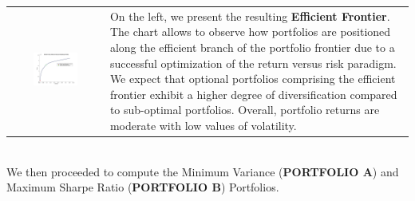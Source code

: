 \documentclass{assignment}
\begin{document}
\begin{tabular}{c m{}}
    \includegraphics[width=0.50\textwidth, valign=c]{assets/Plot_1.jpg}
    &
    On the left, we present the resulting \textbf{Efficient Frontier}. The chart allows to observe
    how portfolios are positioned along the efficient branch of the portfolio frontier due to a
    successful optimization of the return versus risk paradigm. We expect that optional portfolios
    comprising the efficient frontier exhibit a higher degree of diversification compared to
    sub-optimal portfolios. Overall, portfolio returns are moderate with low values of volatility. 
\end{tabular}
\\
We then proceeded to compute the Minimum Variance (\textbf{PORTFOLIO A}) and Maximum Sharpe Ratio
(\textbf{PORTFOLIO B}) Portfolios.
\end{document}
